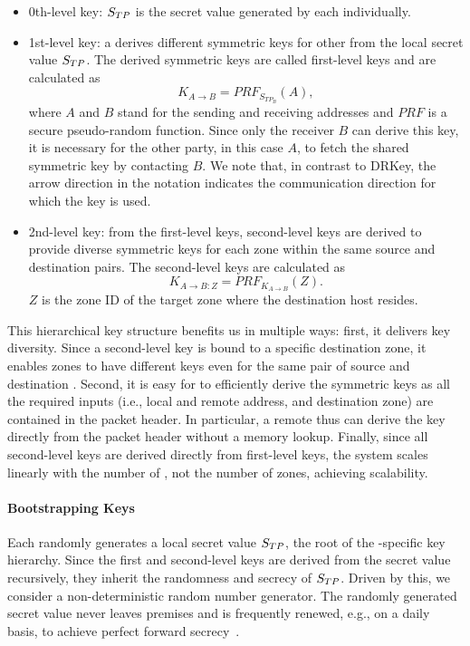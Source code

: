 \begin{itemize}
	\item 0th-level key: $S_{TP}$ is the secret value generated by each \tp individually.
	\item 1st-level key: a \tp derives different symmetric keys for other \tps from the
	      local secret value $S_{TP}$. The derived symmetric keys are called first-level keys and
	      are calculated as
	      \begin{equation}
		      K_{A \rightarrow B} = PRF_{S_{{TP}_B}}(A),
		      \label{eq:1stkey}
	      \end{equation}
	      where $A$ and $B$ stand for the sending and receiving \tp addresses and $PRF$ is a secure pseudo-random
	      function. Since only the receiver $B$ can derive this key, it is necessary for
	      the other party, in this case $A$, to fetch the shared symmetric key by contacting
	      $B$. We note that, in contrast to DRKey, the arrow direction
	      in the notation indicates the communication direction for which the key is used.
	\item 2nd-level key: from the first-level keys, second-level keys are derived to
	      provide diverse symmetric keys for each zone within the same source and destination
	      \tp pairs. The second-level keys are calculated as
	      \begin{equation}
		      K_{A \rightarrow B:Z} = PRF_{K_{A \rightarrow B}}(Z).
		      \label{eq:2ndkey}
	      \end{equation}
	      $Z$ is the zone ID of the target zone where the destination host resides.
\end{itemize}

This hierarchical key structure benefits us in multiple ways: first, it delivers
key diversity. Since a second-level key is bound to a specific destination zone, it enables
zones to have different keys even for the same pair of source and destination \tps.
Second, it is easy for \tps to efficiently derive the symmetric keys as all the
required inputs (i.e., local and remote \tp address, and
destination zone) are contained in the packet header. In particular, a remote \tp
thus can derive the key directly from the packet header without a memory lookup.
Finally, since all second-level keys are derived directly from first-level keys,
the system scales linearly with the number of \tps, not the number of zones, achieving scalability.

\paragraph{Bootstrapping Keys}
Each \tp randomly generates a local secret value $S_{TP}$, the root of the \tp-specific
key hierarchy. Since the first and second-level keys are derived from the secret value
recursively, they inherit the randomness and secrecy of $S_{TP}$. Driven by this, we
consider a non-deterministic random number generator. The randomly generated secret value
never leaves \tp premises and is frequently renewed, e.g., on a daily basis, to achieve
perfect forward secrecy~\cite{rfc1363}.


